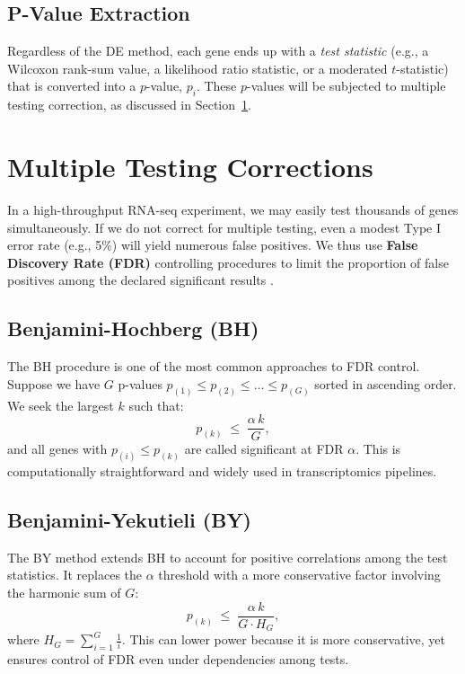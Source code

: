 \documentclass[12pt]{article}
\begin{document}
\subsection{P-Value Extraction}

Regardless of the DE method, each gene ends up with a \emph{test statistic} (e.g., a Wilcoxon rank-sum value, a likelihood ratio statistic, or a moderated $t$-statistic) that is converted into a $p$-value, $p_i$. These $p$-values will be subjected to multiple testing correction, as discussed in Section~\ref{sec:multtest}.

\section{Multiple Testing Corrections}
\label{sec:multtest}

In a high-throughput RNA-seq experiment, we may easily test thousands of genes simultaneously. If we do not correct for multiple testing, even a modest Type I error rate (e.g., 5\%) will yield numerous false positives. We thus use \textbf{False Discovery Rate (FDR)} controlling procedures to limit the proportion of false positives among the declared significant results .

\subsection{Benjamini-Hochberg (BH)}
The BH procedure \cite{benjamini1995controlling} is one of the most common approaches to FDR control. Suppose we have $G$ p-values $p_{(1)} \le p_{(2)} \le \ldots \le p_{(G)}$ sorted in ascending order. We seek the largest $k$ such that:
\[
p_{(k)} \;\le\; \frac{\alpha \, k}{G},
\]
and all genes with $p_{(i)} \le p_{(k)}$ are called significant at FDR $\alpha$. This is computationally straightforward and widely used in transcriptomics pipelines.

\subsection{Benjamini-Yekutieli (BY)}
The BY \cite{benjamini2001control} method extends BH to account for positive correlations among the test statistics. It replaces the $\alpha$ threshold with a more conservative factor involving the harmonic sum of $G$:
\[
p_{(k)} \;\le\; \frac{\alpha \, k}{G \cdot H_G},
\]
where $H_G = \sum_{i=1}^G \frac{1}{i}$. This can lower power because it is more conservative, yet ensures control of FDR even under dependencies among tests.
\end{document}
